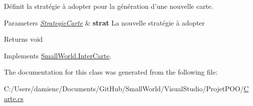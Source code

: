 Définit la stratégie à adopter pour la génération d'une nouvelle carte. 


\begin{DoxyParams}{Parameters}
{\em \hyperlink{class_small_world_1_1_strategie_carte}{Strategie\-Carte}} & {\bfseries strat} La nouvelle stratégie à adopter \\
\hline
\end{DoxyParams}
\begin{DoxyReturn}{Returns}
void 
\end{DoxyReturn}


Implements \hyperlink{interface_small_world_1_1_inter_carte_a23c669cb523f222f53e8ab91a8944472}{Small\-World.\-Inter\-Carte}.



The documentation for this class was generated from the following file\-:\begin{DoxyCompactItemize}
\item 
C\-:/\-Users/damienc/\-Documents/\-Git\-Hub/\-Small\-World/\-Visual\-Studio/\-Projet\-P\-O\-O/\hyperlink{_carte_8cs}{Carte.\-cs}\end{DoxyCompactItemize}
